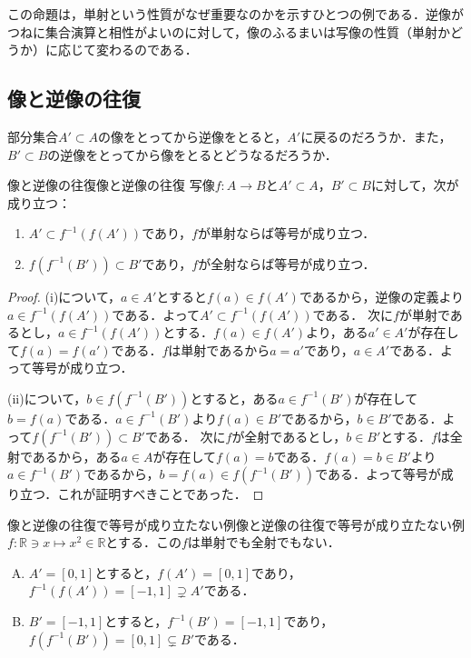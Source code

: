 この命題は，単射という性質がなぜ重要なのかを示すひとつの例である．逆像がつねに集合演算と相性がよいのに対して，像のふるまいは写像の性質（単射かどうか）に応じて変わるのである．

\subsection{像と逆像の往復}

部分集合$A' \subset A$の像をとってから逆像をとると，$A'$に戻るのだろうか．また，$B' \subset B$の逆像をとってから像をとるとどうなるだろうか．

\begin{prop}{像と逆像の往復}{像と逆像の往復}
  写像$f \colon A \to B$と$A' \subset A$，$B' \subset B$に対して，次が成り立つ：
  \begin{enumerate}[label=(\roman*),leftmargin=3.2em]
    \item $A' \subset f^{-1}(f(A'))$であり，$f$が単射ならば等号が成り立つ．
    \item $f(f^{-1}(B')) \subset B'$であり，$f$が全射ならば等号が成り立つ．
  \end{enumerate}
\end{prop}

\begin{tleftbar}
  \begin{proof}
    (i)について，$a \in A'$とすると$f(a) \in f(A')$であるから，逆像の定義より$a \in f^{-1}(f(A'))$である．よって$A' \subset f^{-1}(f(A'))$である．
    次に$f$が単射であるとし，$a \in f^{-1}(f(A'))$とする．$f(a) \in f(A')$より，ある$a' \in A'$が存在して$f(a) = f(a')$である．$f$は単射であるから$a = a'$であり，$a \in A'$である．よって等号が成り立つ．

    (ii)について，$b \in f(f^{-1}(B'))$とすると，ある$a \in f^{-1}(B')$が存在して$b = f(a)$である．$a \in f^{-1}(B')$より$f(a) \in B'$であるから，$b \in B'$である．よって$f(f^{-1}(B')) \subset B'$である．
    次に$f$が全射であるとし，$b \in B'$とする．$f$は全射であるから，ある$a \in A$が存在して$f(a) = b$である．$f(a) = b \in B'$より$a \in f^{-1}(B')$であるから，$b = f(a) \in f(f^{-1}(B'))$である．よって等号が成り立つ．これが証明すべきことであった．
  \end{proof}
\end{tleftbar}

\begin{example}{像と逆像の往復で等号が成り立たない例}{像と逆像の往復で等号が成り立たない例}
  $f \colon \mathbb{R} \ni x \mapsto x^2 \in \mathbb{R}$とする．この$f$は単射でも全射でもない．
  \begin{enumerate}[(A)]
    \item $A' = [0, 1]$とすると，$f(A') = [0, 1]$であり，$f^{-1}(f(A')) = [-1, 1] \supsetneq A'$である．
    \item $B' = [-1, 1]$とすると，$f^{-1}(B') = [-1, 1]$であり，$f(f^{-1}(B')) = [0, 1] \subsetneq B'$である．
  \end{enumerate}
\end{example}

